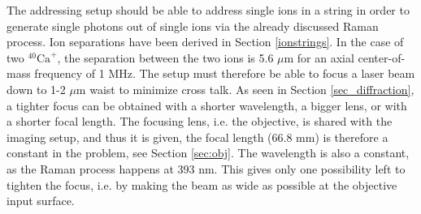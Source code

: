The addressing setup should be able to address single ions in a string in order to generate single photons out of single ions via the already discussed Raman process. Ion separations have been derived in Section \ref{ionstrings}. In the case of two $^{40}\text{Ca}^+$, the separation between the two ions is 5.6 $\mu$m for an axial center-of-mass frequency of 1 MHz. The setup must therefore be able to focus a laser beam down to 1-2 $\mu$m waist to minimize cross talk. As seen in Section \ref{sec_diffraction}, a tighter focus can be obtained with a shorter wavelength, a bigger lens, or with a shorter focal length. The focusing lens, i.e. the objective, is shared with the imaging setup, and thus it is given, the focal length (66.8 mm) is therefore a constant in the problem, see Section \ref{sec:obj}. The wavelength is also a constant, as the Raman process happens at 393 nm. This gives only one possibility left to tighten the focus, i.e. by making the beam as wide as possible at the objective input surface.\par
